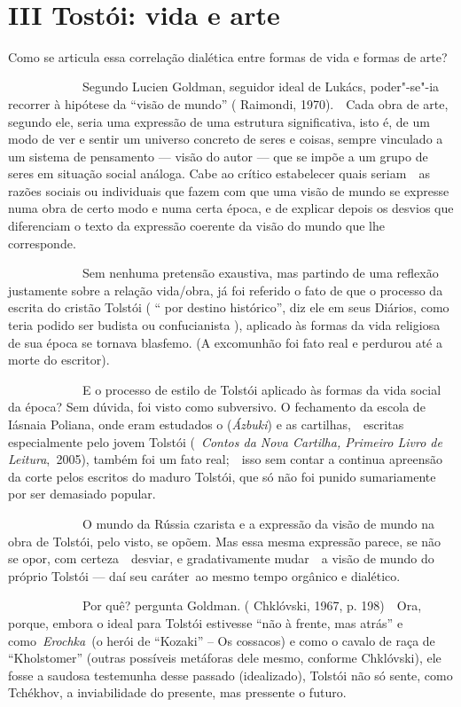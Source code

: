 ~

\section{III Tostói: vida e arte}

Como se articula essa correlação dialética entre formas de vida e formas
de arte?

~~~~~~~~~~~~Segundo Lucien Goldman, seguidor ideal de Lukács,
poder"-se"-ia recorrer à hipótese da ``visão de mundo'' ( Raimondi,
1970).~~Cada obra de arte, segundo ele, seria uma expressão de uma
estrutura significativa, isto é, de um modo de ver e sentir um universo
concreto de seres e coisas, sempre vinculado a um sistema de pensamento
--- visão do autor --- que se impõe a um grupo de seres em situação social
análoga. Cabe ao crítico estabelecer quais seriam~~as razões sociais ou
individuais que fazem com que uma visão de mundo se expresse numa obra
de certo modo e numa certa época, e de explicar depois os desvios que
diferenciam o texto da expressão coerente da visão do mundo que lhe
corresponde.

~~~~~~~~~~~~Sem nenhuma pretensão exaustiva, mas partindo de uma
reflexão justamente sobre a relação vida/obra, já foi referido o fato de
que o processo da escrita do cristão Tolstói ( `` por destino
histórico'', diz ele em seus Diários, como teria podido ser budista ou
confucianista ), aplicado às formas da vida religiosa de sua época se
tornava blasfemo. (A excomunhão foi fato real e perdurou até a morte do
escritor).

~~~~~~~~~~~~E o processo de estilo de Tolstói aplicado às formas da vida
social da época? Sem dúvida, foi visto como subversivo. O fechamento da
escola de Iásnaia Poliana, onde eram estudados o  (\emph{Ázbuki}) e
as cartilhas,~~escritas especialmente pelo jovem Tolstói (~\emph{Contos
da Nova Cartilha, Primeiro Livro de Leitura},\emph{~}2005), também foi
um fato real;~~isso sem contar a continua apreensão da corte pelos
escritos do maduro Tolstói, que só não foi punido sumariamente por ser
demasiado popular.

~~~~~~~~~~~~O mundo da Rússia czarista e a expressão da visão de mundo
na obra de Tolstói, pelo visto, se opõem. Mas essa mesma expressão
parece, se não se opor, com certeza~~desviar, e gradativamente mudar~~a
visão de mundo do próprio Tolstói --- daí seu caráter~ao mesmo tempo
orgânico e dialético.

~~~~~~~~~~~~Por quê? pergunta Goldman. ( Chklóvski, 1967, p. 198)~~Ora,
porque, embora o ideal para Tolstói estivesse ``não à frente, mas
atrás'' e como~\emph{Erochka}~(o herói de ``Kozaki'' -- Os cossacos) e
como o cavalo de raça de ``Kholstomer'' (outras possíveis metáforas dele
mesmo, conforme Chklóvski), ele fosse a saudosa testemunha desse passado
(idealizado), Tolstói não só sente, como Tchékhov, a inviabilidade do
presente, mas pressente o futuro.

